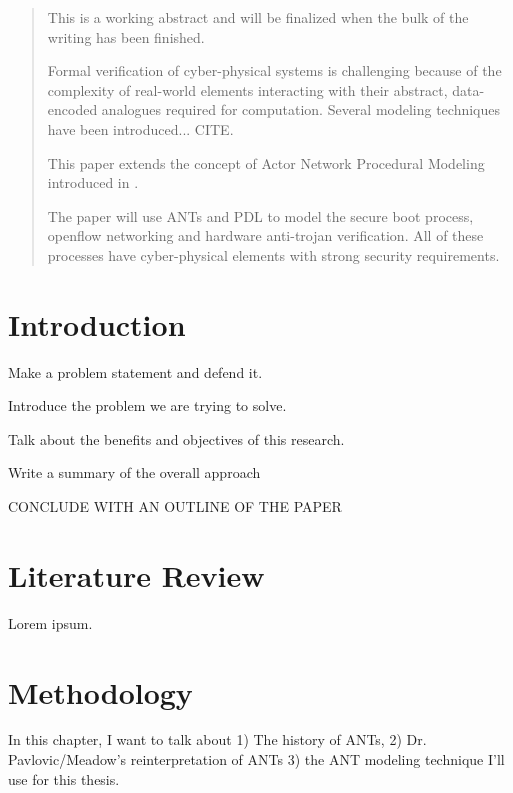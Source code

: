 \documentclass[11pt]{../uhthesis}
\begin{document}
\begin{frontmatter}
\begin{abstract}
This is a working abstract and will be finalized when the bulk of the writing has been finished.

Formal verification of cyber-physical systems is challenging because of the complexity of real-world elements interacting with their abstract, data-encoded analogues required for computation.  Several modeling techniques have been introduced... CITE.

This paper extends the concept of Actor Network Procedural Modeling introduced in \cite{ANTs:2011}.

The paper will use ANTs and PDL to model the secure boot process, openflow networking and hardware anti-trojan verification.  All of these processes have cyber-physical elements with strong security requirements.


\end{abstract}


\tableofcontents


\listoftables


\listoffigures

\end{frontmatter}


\chapter{Introduction}

Make a problem statement and defend it.

Introduce the problem we are trying to solve.

Talk about the benefits and objectives of this research.

Write a summary of the overall approach 

CONCLUDE WITH AN OUTLINE OF THE PAPER 


\chapter{Literature Review}

Lorem ipsum.


\chapter{Methodology}

In this chapter, I want to talk about 1) The history of ANTs, 2) Dr. Pavlovic/Meadow's reinterpretation of ANTs 3) the ANT modeling technique I'll use for this thesis.
\end{document}
